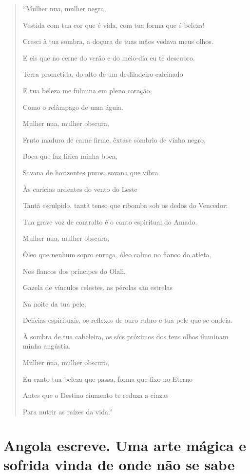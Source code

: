 \documentclass[
  letterpaper,
  DIV=11,
  numbers=noendperiod]{scrreprt}
\begin{document}
\begin{quote}
``Mulher nua, mulher negra,

Vestida com tua cor que é vida, com tua forma que é beleza!

Cresci à tua sombra, a doçura de tuas mãos vedava meus olhos.

E eis que no cerne do verão e do meio-dia eu te descubro.

Terra prometida, do alto de um desfiladeiro calcinado

E tua beleza me fulmina em pleno coração,

Como o relâmpago de uma águia.

Mulher nua, mulher obscura,

Fruto maduro de carne firme, êxtase sombrio de vinho negro,

Boca que faz lírica minha boca,

Savana de horizontes puros, savana que vibra

Às carícias ardentes do vento do Leste

Tantã esculpido, tantã tenso que ribomba sob os dedos do Vencedor:

Tua grave voz de contralto é o canto espiritual do Amado.

Mulher nua, mulher obscura,

Óleo que nenhum sopro enruga, óleo calmo no flanco do atleta,

Nos flancos dos príncipes do Olali,

Gazela de vínculos celestes, as pérolas são estrelas

Na noite da tua pele;

Delícias espirituais, os reflexos de ouro rubro e tua pele que se
ondeia.

À sombra de tua cabeleira, os sóis próximos dos teus olhos iluminam
minha angústia.

Mulher nua, mulher obscura,

Eu canto tua beleza que passa, forma que fixo no Eterno

Antes que o Destino ciumento te reduza a cinzas

Para nutrir as raízes da vida.''
\end{quote}

\chapter{Angola escreve. Uma arte mágica e sofrida vinda de onde não se
sabe}\label{angola-escreve.-uma-arte-muxe1gica-e-sofrida-vinda-de-onde-nuxe3o-se-sabe}
\end{document}
